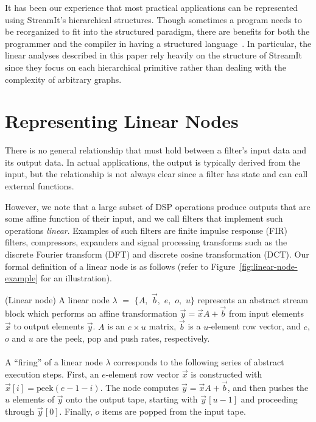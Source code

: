 \documentclass{sig-alternate}
\begin{document}
It has been our experience that most practical applications can be
represented using StreamIt's hierarchical structures.  Though
sometimes a program needs to be reorganized to fit into the structured
paradigm, there are benefits for both the programmer and the compiler
in having a structured language~\cite{streamitcc}.  In particular, the
linear analyses described in this paper rely heavily on the structure
of StreamIt since they focus on each hierarchical primitive rather
than dealing with the complexity of arbitrary graphs.

\vspace{6pt}
\section{Representing Linear Nodes}
\label{sec:linearrep}

There is no general relationship that must hold between a
filter's input data and its output data. In actual applications, the
output is typically derived from the input, but the relationship is
not always clear since a filter has state and can call external
functions.

However, we note that a large subset of DSP operations produce outputs
that are some affine function of their input, and we call filters that
implement such operations {\it linear}. Examples of such filters are
finite impulse response (FIR) filters, compressors, expanders and
signal processing transforms such as the discrete Fourier transform
(DFT) and discrete cosine transformation (DCT).  Our formal definition
of a linear node is as follows (refer to
Figure~\ref{fig:linear-node-example} for an illustration).
\vspace{-4pt}
\begin{definition}(Linear node)
A linear node $\lambda$ $=$ $\{A,$ $\vec{b},$ $e,$ $o,$ $u\}$
represents an abstract stream block which performs an affine
transformation $\vec{y} = \vec{x} A + \vec{b}$ from input elements 
$\vec{x}$ to output elements $\vec{y}$. $A$ is an $e \times u$ matrix, $\vec{b}$ is a
$u$-element row vector, and $e$, $o$ and $u$ are the peek, pop and
push rates, respectively. \\ 
~ \vspace{-6pt} \\
A ``firing'' of a linear node $\lambda$ corresponds to the following
series of abstract execution steps.  First, an $e$-element row vector
$\vec{x}$ is constructed with $\vec{x}[i] = \mbox{peek}(e-1-i)$.  The node
computes $\vec{y} = \vec{x} A + \vec{b}$, and then pushes the $u$ elements 
of $\vec{y}$ onto the output tape, starting with $\vec{y}\hspace{1pt}[u-1]$ 
and proceeding through $\vec{y}\hspace{1pt}[0]$.
Finally, $o$ items are popped from the input tape.
\end{definition} \vspace{-2pt}
\end{document}
